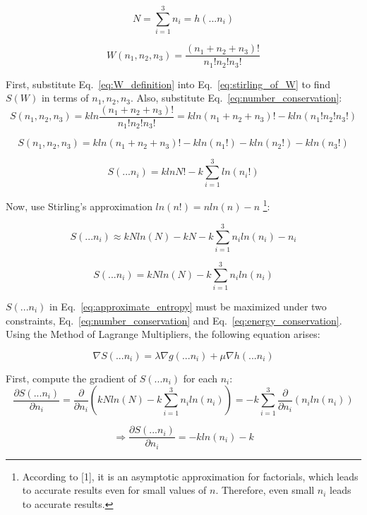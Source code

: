 \documentclass{article}
\begin{document}
\begin{equation} \label{eq:number_conservation}
  N = \sum_{i=1}^{3}{n_i} = h(...n_i)
\end{equation}

\begin{equation} \label{eq:W_definition}
  W(n_1, n_2, n_3) = \frac{(n_1 + n_2 + n_3)!}{n_1!n_2!n_3!}
\end{equation}

First, substitute Eq.~\eqref{eq:W_definition} into Eq.~\eqref{eq:stirling_of_W} to find $S(W)$ in terms of $n_1, n_2, n_3$. Also, substitute Eq.~\eqref{eq:number_conservation}:
\[
  S(n_1, n_2, n_3) = kln \frac{(n_1 + n_2 + n_3)!}{n_1!n_2!n_3!} = kln (n_1 + n_2 + n_3)! - kln(n_1!n_2!n_3!)
\]

\[
  S(n_1, n_2, n_3) = kln(n_1 + n_2 + n_3)! - kln(n_1!) - kln(n_2!) - kln(n_3!)
\]

\[
  S(...n_i) = kln N! - k\sum_{i=1}^{3}{ln(n_i!)}
\]

Now, use Stirling's approximation $ln(n!) = nln(n) - n$ \footnote{According to [1], it is an asymptotic approximation for factorials, which leads to accurate results even for small values of $n$. Therefore, even small $n_i$ leads to accurate results.}:

\[
  S(...n_i) \approx kNln(N) - kN - k\sum_{i=1}^{3}{n_iln(n_i) - n_i}
\]

\begin{equation} \label{eq:approximate_entropy}
  S(...n_i) = kNln(N) - k\sum_{i=1}^{3}{n_iln(n_i)}
\end{equation}

$S(...n_i)$ in Eq.~\eqref{eq:approximate_entropy} must be maximized under two constraints, Eq.~\eqref{eq:number_conservation} and Eq.~\eqref{eq:energy_conservation}. Using the Method of Lagrange Multipliers, the following equation arises:

\begin{equation} \label{eq:lagrange_method}
  \nabla S(...n_i) = \lambda \nabla g(...n_i) + \mu \nabla h(...n_i)
\end{equation}

First, compute the gradient of $S(...n_i)$ for each $n_i$:
\begin{equation*}
  \frac{ \partial S(...n_i)} {\partial{n_i}} = \frac{ \partial }{\partial{n_i}} (kNln(N) - k\sum_{i=1}^{3}{n_iln(n_i)}) = -k
  \sum_{i=1}^{3}{\frac{\partial}{\partial{n_i}} (n_iln(n_i))}
\end{equation*}

\begin{equation} \label{eq:h2:first_term}
  \Rightarrow \frac { \partial S(...n_i) }{\partial n_i} = -kln(n_i) - k 
\end{equation}
\end{document}
